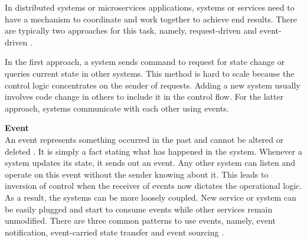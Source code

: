 
In distributed systems or microservices applications, systems or services need to have a mechanism to coordinate and work together to achieve end results. There are typically two approaches for this task, namely, request-driven and event-driven \cite{stopford2018designingeventdriven}.

In the first approach, a system sends command to request for state change or queries current state in other systems. This method is hard to scale because the control logic concentrates on the sender of requests. Adding a new system usually involves code change in others to include it in the control flow. For the latter approach, systems communicate with each other using events.

\textbf{Event}\\
An event represents something occurred in the past and cannot be altered or deleted \cite{cqrsgregyoung}. It is simply a fact stating what has happened in the system. Whenever a system updates its state, it sends out an event. Any other system can listen and operate on this event without the sender knowing about it. This leads to inversion of control when the receiver of events now dictates the operational logic. As a result, the systems can be more loosely coupled. New service or system can be easily plugged and start to consume events while other services remain unmodified. There are three common patterns to use events, namely, event notification, event-carried state transfer and event sourcing \cite{martinfowlereventdriven}.

